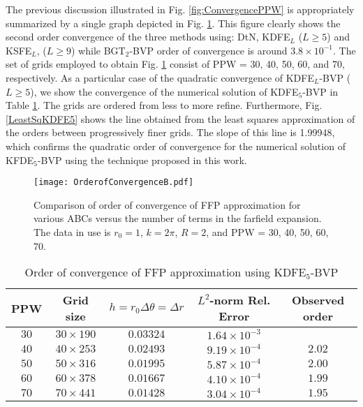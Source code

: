 \documentclass[final,3p,times,12pt]{elsarticle}
\begin{document}
The previous discussion illustrated in Fig. \ref{fig:ConvergencePPW} is appropriately summarized by a single graph depicted in Fig. \ref{fig:OrderConv}. This figure clearly shows the second order convergence of the three methods using: DtN, KDFE$_L$ ($L\ge 5$) and KSFE$_{L}$, ($L\ge 9$) while BGT$_2$-BVP order of convergence is around $3.8 \times 10^{-1}$. The set of grids employed to obtain Fig. \ref{fig:OrderConv} consist of PPW = 30, 40, 50, 60, and 70, respectively. 
As a particular case of the quadratic convergence  of KDFE$_L$-BVP ($L\ge 5$), we show the convergence of the numerical solution of KDFE$_5$-BVP in Table \ref{table:1}. The grids are ordered from less to more refine. Furthermore,
Fig. \ref{LeastSqKDFE5} shows the line obtained from the least squares approximation of the orders between progressively finer grids. The slope of this line is 1.99948, which confirms the quadratic order of convergence for the numerical solution of KFDE$_5$-BVP using the technique proposed in this work.

\begin{figure}[h]
\begin{center}
\texttt{[image: OrderofConvergenceB.pdf]} 
\end{center}
\caption{Comparison of order of convergence of FFP approximation for various ABCs versus the number of terms in the farfield expansion. The data in use is $r_0=1$, $k=2\pi$, $R=2$, and PPW = 30, 40, 50, 60, 70.}
\label{fig:OrderConv}
\end{figure}

\begin{table}[h!]
\centering
\begin{tabular}{||c c c c c||}
\hline
   PPW    & Grid size & $h= r_{0} \Delta \theta = \Delta r$   & $L^2$-norm Rel. Error   & Observed order \\ [0.5ex]
   \hline\hline
    $30$   & $30\times 190$  & $0.03324$  & $1.64\times 10^{-3}$  & $ $    \\
 $40$   & $40\times 253$  & $0.02493$  & $9.19\times 10^{-4}$  & $ 2.02$    \\
 $50$   & $50\times 316$  & $0.01995$  & $5.87\times 10^{-4}$  & $ 2.00$    \\
 $60$   & $60\times 378$  & $0.01667$  & $4.10\times 10^{-4}$  & $ 1.99$    \\
$70$   & $70\times 441$  & $0.01428$  & $3.04\times 10^{-4}$  & $ 1.95$    \\
[1ex]
\hline
\end{tabular}
\caption{Order of convergence of FFP approximation using KDFE$_5$-BVP}
\label{table:1}
\end{table}
\end{document}
